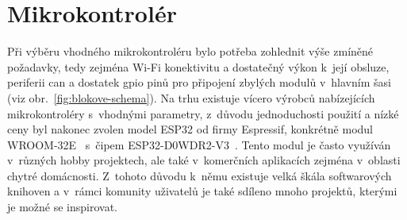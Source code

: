 \section{Mikrokontrolér}

    Při výběru vhodného mikrokontroléru bylo potřeba zohlednit výše zmíněné požadavky, tedy zejména Wi-Fi konektivitu a dostatečný výkon k~její obsluze, periferii \acs{can} a dostatek \acs{gpio} pinů pro připojení zbylých modulů v~hlavním šasi (viz obr.~\ref{fig:blokove-schema}). Na trhu existuje vícero výrobců nabízejících mikrokontroléry s~vhodnými parametry, z~důvodu jednoduchosti použití a nízké ceny byl nakonec zvolen model ESP32 od firmy Espressif, konkrétně modul WROOM-32E~\cite{esp32-wroom-32e-datasheet} s~čipem ESP32-D0WDR2-V3~\cite{esp32-datasheet}. Tento modul je často využíván v~různých hobby projektech, ale také v~komerčních aplikacích zejména v~oblasti chytré domácnosti. Z~tohoto důvodu k~němu existuje velká škála softwarových knihoven a v~rámci komunity uživatelů je také sdíleno mnoho projektů, kterými je možné se inspirovat.